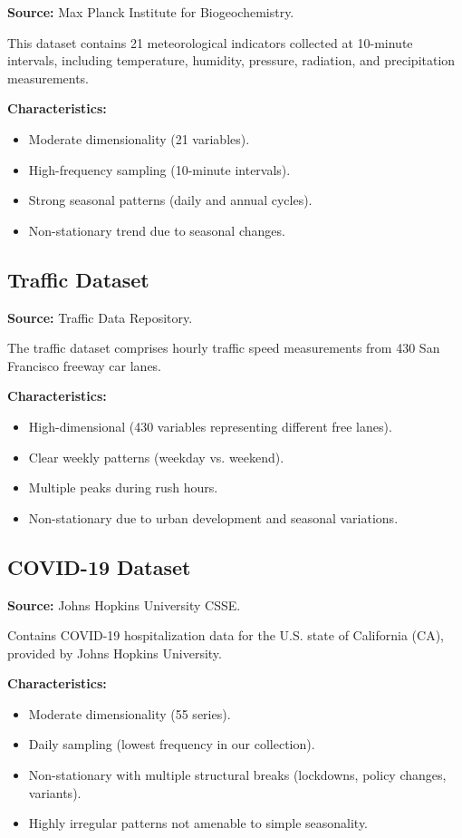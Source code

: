 \documentclass[conference]{IEEEtran}
\begin{document}
\textbf{Source:} Max Planck Institute for Biogeochemistry.

This dataset contains 21 meteorological indicators collected at
10-minute intervals, including temperature, humidity, pressure,
radiation, and precipitation measurements.

\textbf{Characteristics:}

\begin{itemize}
    \item Moderate dimensionality (21 variables).
    \item High-frequency sampling (10-minute intervals).
    \item Strong seasonal patterns (daily and annual cycles).
    \item Non-stationary trend due to seasonal changes.
\end{itemize}

\subsection{Traffic Dataset}

\textbf{Source:} Traffic Data Repository.

The traffic dataset comprises hourly traffic speed measurements from
430 San Francisco freeway car lanes.

\textbf{Characteristics:}

\begin{itemize}
    \item High-dimensional (430 variables representing different free lanes).
    \item Clear weekly patterns (weekday vs. weekend).
    \item Multiple peaks during rush hours.
    \item Non-stationary due to urban development and seasonal variations.
\end{itemize}

\subsection{COVID-19 Dataset}

\textbf{Source:} Johns Hopkins University CSSE.

Contains COVID-19 hospitalization data for the U.S. state of
California (CA), provided by Johns Hopkins University.

\textbf{Characteristics:}

\begin{itemize}
    \item Moderate dimensionality (55 series).
    \item Daily sampling (lowest frequency in our collection).
    \item Non-stationary with multiple structural breaks (lockdowns, policy changes, variants).
    \item Highly irregular patterns not amenable to simple seasonality.
\end{itemize}
\end{document}
